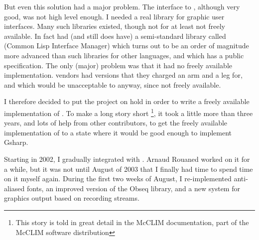But even this solution had a major problem.  The interface to {\xwin},
although very good, was not high level enough.  I needed a real
library for graphic user interfaces.  Many such libraries existed,
though not for {\commonlisp} at least not freely available.  In fact {\commonlisp} had
(and still does have) a semi-standard library called {\clim} (Common
Lisp Interface Manager) which turns out to be an order of magnitude
more advanced than such libraries for other languages, and which has a
public specification.  The only (major) problem was that it had no
freely available implementation.  {\commonlisp} vendors had versions that they
charged an arm and a leg for, and which would be unacceptable to {\gs}
anyway, since not freely available.  

I therefore decided to put the {\gs} project on hold in order to write
a freely available implementation of {\clim}.  To make a long story
short \footnote{This story is told in great detail in the McCLIM
  documentation, part of the McCLIM software distribution}, it took a
little more than three years, and lots of help from other
contributors, to get the freely available implementation of {\clim} to a
state where it would be good enough to implement Gsharp. 

Starting in 2002, I gradually integrated {\gs} with {\clim}.  Arnaud
Rouaned worked on it for a while, but it was not until August of 2003
that I finally had time to spend time on it myself again.  During the
first two weeks of August, I re-implemented anti-aliased fonts, an
improved version of the Obseq library, and a new system for graphics
output based on {\clim} recording streams. 
